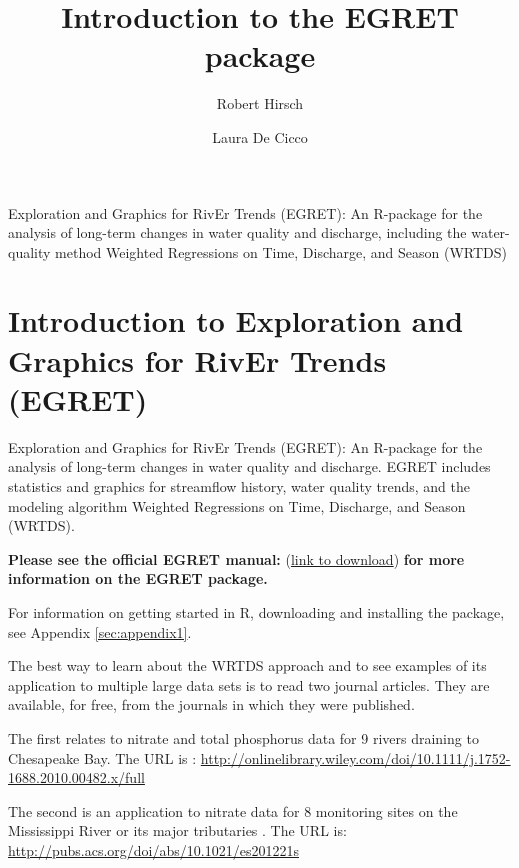 \documentclass[a4paper,11pt]{article}\usepackage{graphicx, color}
\begin{document}
\title{Introduction to the EGRET package}
\author[1]{Robert Hirsch}
\author[1]{Laura De Cicco}

\maketitle

Exploration and Graphics for RivEr Trends (EGRET): An R-package for the analysis of long-term changes in water quality and discharge, including the water-quality method Weighted Regressions on Time, Discharge, and Season (WRTDS)

\tableofcontents

\section{Introduction to Exploration and Graphics for RivEr Trends (EGRET)}

Exploration and Graphics for RivEr Trends (EGRET): An R-package for the analysis of long-term changes in water quality and discharge. EGRET includes statistics and graphics for streamflow history, water quality trends, and the modeling algorithm Weighted Regressions on Time, Discharge, and Season (WRTDS). 


\textbf{Please see the official EGRET manual:}
(\href{https://github.com/USGS-R/EGRET/raw/Documentation/EGRET%2Bmanual_4.doc}{link to download}) 
\textbf{for more information on the EGRET package.}

For information on getting started in R, downloading and installing the package, see Appendix \ref{sec:appendix1}.

The best way to learn about the WRTDS approach and to see examples of its application to multiple large data sets is to read two journal articles.  They are available, for free, from the journals in which they were published.

The first relates to nitrate and total phosphorus data for 9 rivers draining to Chesapeake Bay.  The URL is \cite{HirschII}: 
\url{http://onlinelibrary.wiley.com/doi/10.1111/j.1752-1688.2010.00482.x/full}

The second is an application  to nitrate data for 8 monitoring sites on the Mississippi River or its major tributaries \cite{HirschIII}.  The URL is: \url{http://pubs.acs.org/doi/abs/10.1021/es201221s}
\end{document}
